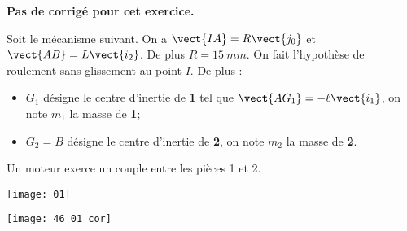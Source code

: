 \normalfalse \difficiletrue \tdifficilefalse
\correctiontrue


\setcounter{question}{0}
\ifcorrection
\else
\textbf{Pas de corrigé pour cet exercice.}
\fi

\ifprof
\else
Soit le mécanisme suivant. On a $\vect{IA}=R\vect{j_0}$ et $\vect{AB}=L\vect{i_2}$. De plus $R=\SI{15}{mm}$.
On fait l'hypothèse de roulement sans glissement au point $I$. De plus :
\begin{itemize}
\item $G_1$ désigne le centre d'inertie de \textbf{1} tel que $\vect{AG_1}=-\ell\vect{i_1}$, on note $m_1$ la masse de \textbf{1};%
\item $G_2=B$ désigne le centre d'inertie de \textbf{2}, on note $m_2$ la masse de \textbf{2}.%
\end{itemize}
Un moteur exerce un couple entre les pièces 1 et 2. 
\begin{center}
\texttt{[image: 01]}
\end{center}
\fi

\ifprof
\begin{center}
\texttt{[image: 46\_01\_cor]}
\end{center}

\else
\fi

\ifprof

